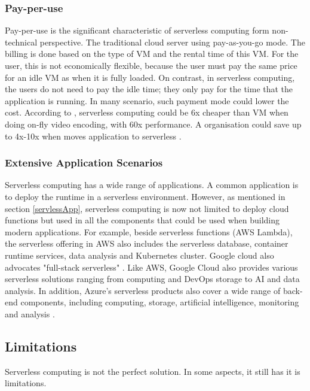 \subsubsection{Pay-per-use}
Pay-per-use is the significant characteristic of serverless computing form non-technical perspective. The traditional cloud server using pay-as-you-go mode. The billing is done based on the type of VM and the rental time of this VM. For the user, this is not economically flexible, because the user must pay the same price for an idle VM as when it is fully loaded. On contrast, in serverless computing, the users do not need to pay the idle time; they only pay for the time that the application is running. In many scenario, such payment mode could lower the cost. According to \cite{jonas2019cloud}, serverless computing could be 6x cheaper than VM when doing on-fly video encoding, with 60x performance. A organisation could save up to 4x-10x when moves application to serverless \cite{jonas2019cloud}\cite{Serverle67:online}.
\subsubsection{Extensive Application Scenarios}
Serverless computing has a wide range of applications. A common application is to deploy the runtime in a serverless environment.
However, as mentioned in section \ref{servlessApp}, serverless computing is now not limited to deploy cloud functions but used in all the components that could be used when building modern applications. 
For example, beside serverless functions (AWS Lambda), the serverless offering in AWS also includes the serverless database, container runtime services, data analysis and Kubernetes cluster. Google cloud also advocates "full-stack serverless" \cite{Serverle29:online}. Like AWS, Google Cloud also provides various serverless solutions ranging from computing and DevOps storage to AI and data analysis. In addition, Azure's serverless products also cover a wide range of back-end components, including computing, storage, artificial intelligence, monitoring and analysis \cite{AzureSer56:online}.
\subsection{Limitations}
\label{servlesslimitation}
Serverless computing is not the perfect solution. In some aspects, it still has it is limitations.
